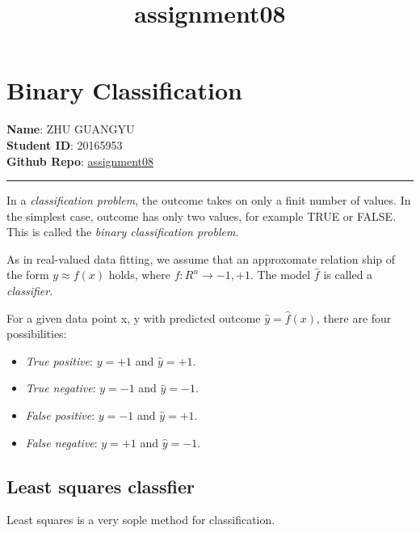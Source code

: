 \documentclass[11pt]{article}
\title{assignment08}
\providecommand{\tightlist}{%
      \setlength{\itemsep}{0pt}\setlength{\parskip}{0pt}}
\begin{document}
    
    
    \maketitle
    
    

    
    \section{Binary Classification}\label{binary-classification}

\textbf{Name}: ZHU GUANGYU\\
\textbf{Student ID}: 20165953\\
\textbf{Github Repo}:
\href{https://github.com/z1ggy-o/cv_assignment/tree/master/assignment08}{assignment08}

\begin{center}\rule{0.5\linewidth}{\linethickness}\end{center}

In a \emph{classification problem}, the outcome takes on only a finit
number of values. In the simplest case, outcome has only two values, for
example TRUE or FALSE. This is called the \emph{binary classification
problem}.

As in real-valued data fitting, we assume that an approxomate relation
ship of the form \(y \approx f(x)\) holds, where
\(f: R^{n} \rightarrow {-1, +1}\). The model \(\hat{f}\) is called a
\emph{classifier}.

For a given data point x, y with predicted outcome
\(\hat{y} = \hat{f}(x)\), there are four possibilities:

\begin{itemize}
\tightlist
\item
  \emph{True positive}: \(y = +1\) and \(\hat{y} = +1\).
\item
  \emph{True negative}: \(y = -1\) and \(\hat{y} = -1\).
\item
  \emph{False positive}: \(y = -1\) and \(\hat{y} = +1\).
\item
  \emph{False negative}: \(y = +1\) and \(\hat{y} = -1\).
\end{itemize}

\subsection{Least squares classfier}\label{least-squares-classfier}

Least squares is a very sople method for classification.
\end{document}

